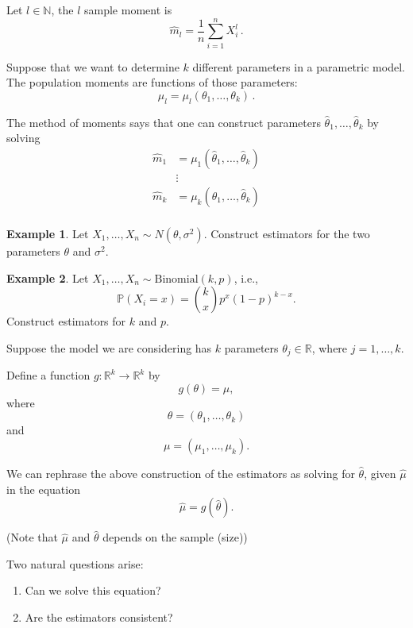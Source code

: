 \documentclass[
  openany]{book}
\theoremstyle{definition}
\theoremstyle{definition}
\newtheorem{example}{Example}[chapter]
\theoremstyle{definition}
\theoremstyle{definition}
\theoremstyle{remark}
\begin{document}
Let \(l \in \mathbb{N}\), the \(l\) sample moment is
\[
   \hat m_l = \frac 1 n \sum_{i=1}^n X_i^l \,.
\]

Suppose that we want to determine \(k\) different parameters in a parametric model.
The population moments are functions of those parameters:
\[
 \mu_l = \mu_l (\theta_1, \dots, \theta_k) \,.
\]

The method of moments says that one can construct parameters \(\hat \theta_1, \dots, \hat \theta_k\) by solving
\begin{equation}
    \begin{aligned}
        \hat m_1 &= \mu_1 (\hat \theta_1, \dots, \hat \theta_k) \\
        &\vdots\\
        \hat m_k &= \mu_k (\hat \theta_1, \dots, \hat \theta_k) \\
    \end{aligned}
        \label{eq:moments}
\end{equation}

\begin{example}
Let \(X_1, \dots, X_n \sim N(\theta, \sigma^2)\).
Construct estimators for the two parameters \(\theta\) and \(\sigma^2\).
\end{example}

\begin{example}
Let \(X_1, \dots, X_n \sim \mathrm{Binomial}(k,p)\), i.e.,
\[ \mathbb{P}(X_i = x) ={k \choose x} p^x (1-p)^{k-x}. \]
Construct estimators for \(k\) and \(p\).
\end{example}

Suppose the model we are considering has \(k\) parameters \(\theta_j \in \mathbb{R}\),
where \(j = 1, \dots, k\).

Define a function \(g: \mathbb{R}^k \to \mathbb{R}^k\) by
\[ g(\theta) = \mu, \]
where
\[\theta = (\theta_1, \dots, \theta_k)\]
and
\[\mu = (\mu_1, \dots, \mu_k).\]

We can rephrase the above construction of the estimators
as solving for \(\hat \theta\), given \(\hat \mu\) in the equation
\begin{equation}
 \hat \mu = g(\hat \theta) .
 \label{eq:estimator}
 \end{equation}

(Note that \(\hat \mu\) and \(\hat \theta\) depends on the sample (size))

Two natural questions arise:

\begin{enumerate}
\def\labelenumi{\arabic{enumi}.}
\item
  Can we solve this equation?
\item
  Are the estimators consistent?
\end{enumerate}
\end{document}
